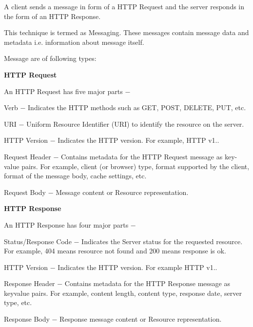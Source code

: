 \begin{DoxyItemize}
\begin{DoxyItemize}
\begin{DoxyItemize}
\item A client sends a message in form of a H\+T\+TP Request and the server responds in the form of an H\+T\+TP Response.
\item This technique is termed as Messaging. These messages contain message data and metadata i.\+e. information about message itself.
\item Message are of following types\+:
\begin{DoxyItemize}
\item {\bfseries H\+T\+TP Request}
\begin{DoxyItemize}
\item An H\+T\+TP Request has five major parts −
\begin{DoxyItemize}
\item Verb − Indicates the H\+T\+TP methods such as G\+ET, P\+O\+ST, D\+E\+L\+E\+TE, P\+UT, etc.
\item U\+RI − Uniform Resource Identifier (U\+RI) to identify the resource on the server.
\item H\+T\+TP Version − Indicates the H\+T\+TP version. For example, H\+T\+TP v1..
\item Request Header − Contains metadata for the H\+T\+TP Request message as key-\/value pairs. For example, client (or browser) type, format supported by the client, format of the message body, cache settings, etc.
\item Request Body − Message content or Resource representation.
\end{DoxyItemize}
\end{DoxyItemize}
\item {\bfseries H\+T\+TP Response}
\begin{DoxyItemize}
\item An H\+T\+TP Response has four major parts −
\begin{DoxyItemize}
\item Status/\+Response Code − Indicates the Server status for the requested resource. For example, 404 means resource not found and 200 means response is ok.
\item H\+T\+TP Version − Indicates the H\+T\+TP version. For example H\+T\+TP v1..
\item Response Header − Contains metadata for the H\+T\+TP Response message as keyvalue pairs. For example, content length, content type, response date, server type, etc.
\item Response Body − Response message content or Resource representation.
\end{DoxyItemize}

\end{DoxyItemize}
\end{DoxyItemize}
\end{DoxyItemize}
\end{DoxyItemize}
\end{DoxyItemize}
